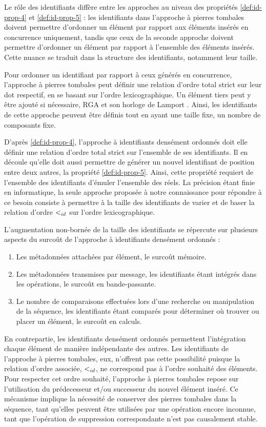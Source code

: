 Le rôle des identifiants diffère entre les approches au niveau des propriétés \ref{def:id-prop-4} et \ref{def:id-prop-5} : les identifiants dans l'approche à pierres tombales doivent permettre d'ordonner un élément par rapport aux éléments insérés en concurrence uniquement, tandis que ceux de la seconde approche doivent permettre d'ordonner un élément par rapport à l'ensemble des éléments insérés.
Cette nuance se traduit dans la structure des identifiants, notamment leur taille.

Pour ordonner un identifiant par rapport à ceux générés en concurrence, l'approche à pierres tombales peut définir une relation d'ordre total strict sur leur dot respectif, \eg en se basant sur l'ordre lexicographique.
Un élément tiers peut y être ajouté si nécessaire, \eg RGA et son horloge de Lamport \cite{1978-happen-before-lamport}.
Ainsi, les identifiants de cette approche peuvent être définis tout en ayant une taille fixe, \ie un nombre de composants fixe.

D'après \ref{def:id-prop-4}, l'approche à identifiants densément ordonnés doit elle définir une relation d'ordre total strict sur l'ensemble de ses identifiants.
Il en découle qu'elle doit aussi permettre de générer un nouvel identifiant de position entre deux autres, \ie la propriété \ref{def:id-prop-5}.
Ainsi, cette propriété requiert de l'ensemble des identifiants d'émuler l'ensemble des réels.
La précision étant finie en informatique, la seule approche proposée à notre connaissance pour répondre à ce besoin consiste à permettre à la taille des identifiants de varier et de baser la relation d'ordre $<_{id}$ sur l'ordre lexicographique.

L'augmentation non-bornée de la taille des identifiants se répercute sur plusieurs aspects du surcoût de l'approche à identifiants densément ordonnés :
\begin{enumerate}
  \item Les métadonnées attachées par élément, \ie le surcoût mémoire.
  \item Les métadonnées transmises par message, les identifiants étant intégrés dans les opérations, \ie le surcoût en bande-passante.
  \item Le nombre de comparaisons effectuées lors d'une recherche ou manipulation de la séquence, les identifiants étant comparés pour déterminer où trouver ou placer un élément, \ie le surcoût en calculs.
\end{enumerate}

En contrepartie, les identifiants densément ordonnés permettent l'intégration chaque élément de manière indépendante des autres.
Les identifiants de l'approche à pierres tombales, eux, n'offrent pas cette possibilité puisque la relation d'ordre associée, $<_{id}$, ne correspond pas à l'ordre souhaité des éléments.
Pour respecter cet ordre souhaité, l'approche à pierres tombales repose sur l'utilisation du prédecesseur et/ou successeur du nouvel élément inséré.
Ce mécanisme implique la nécessité de conserver des pierres tombales dans la séquence, tant qu'elles peuvent être utilisées par une opération encore inconnue, \ie tant que l'opération de suppression correspondante n'est pas causalement stable.

